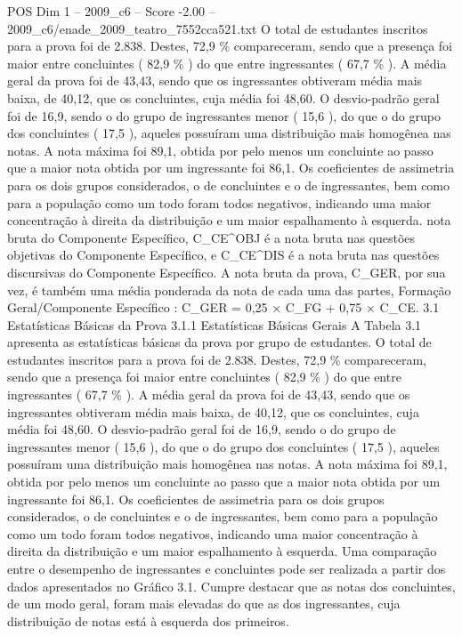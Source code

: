 \begin{textsample}{POS Dim 1 – 2009\_c6 – Score -2.00 – 2009\_c6/enade\_2009\_teatro\_7552cca521.txt}
O total de estudantes inscritos para a prova foi de 2.838.
Destes, 72,9 \% compareceram, sendo que a presença foi maior entre concluintes ( 82,9 \% ) do que entre ingressantes ( 67,7 \% ).
A média geral da prova foi de 43,43, sendo que os ingressantes obtiveram média mais baixa, de 40,12, que os concluintes, cuja média foi 48,60.
O desvio-padrão geral foi de 16,9, sendo o do grupo de ingressantes menor ( 15,6 ), do que o do grupo dos concluintes ( 17,5 ), aqueles possuíram uma distribuição mais homogênea nas notas.
A nota máxima foi 89,1, obtida por pelo menos um concluinte ao passo que a maior nota obtida por um ingressante foi 86,1.
Os coeficientes de assimetria para os dois grupos considerados, o de concluintes e o de ingressantes, bem como para a população como um todo foram todos negativos, indicando uma maior concentração à direita da distribuição e um maior espalhamento à esquerda. nota bruta do Componente Específico, C\_CE\textasciicircum{}OBJ é a nota bruta nas questões objetivas do Componente Específico, e C\_CE\textasciicircum{}DIS é a nota bruta nas questões discursivas do Componente Específico.
A nota bruta da prova, C\_GER, por sua vez, é também uma média ponderada da nota de cada uma das partes, Formação Geral/Componente Específico : C\_GER = 0,25 × C\_FG + 0,75 × C\_CE. 3.1 Estatísticas Básicas da Prova 3.1.1 Estatísticas Básicas Gerais A Tabela 3.1 apresenta as estatísticas básicas da prova por grupo de estudantes.
O total de estudantes inscritos para a prova foi de 2.838.
Destes, 72,9 \% compareceram, sendo que a presença foi maior entre concluintes ( 82,9 \% ) do que entre ingressantes ( 67,7 \% ).
A média geral da prova foi de 43,43, sendo que os ingressantes obtiveram média mais baixa, de 40,12, que os concluintes, cuja média foi 48,60.
O desvio-padrão geral foi de 16,9, sendo o do grupo de ingressantes menor ( 15,6 ), do que o do grupo dos concluintes ( 17,5 ), aqueles possuíram uma distribuição mais homogênea nas notas.
A nota máxima foi 89,1, obtida por pelo menos um concluinte ao passo que a maior nota obtida por um ingressante foi 86,1.
Os coeficientes de assimetria para os dois grupos considerados, o de concluintes e o de ingressantes, bem como para a população como um todo foram todos negativos, indicando uma maior concentração à direita da distribuição e um maior espalhamento à esquerda.
Uma comparação entre o desempenho de ingressantes e concluintes pode ser realizada a partir dos dados apresentados no Gráfico 3.1.
Cumpre destacar que as notas dos concluintes, de um modo geral, foram mais elevadas do que as dos ingressantes, cuja distribuição de notas está à esquerda dos primeiros.

\end{textsample}

